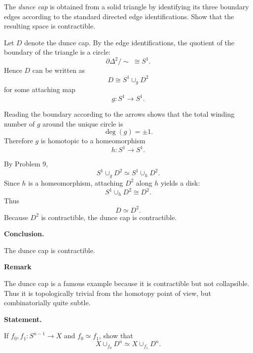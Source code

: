 \begin{problem}
The \emph{dunce cap} is obtained from a solid triangle by identifying its three boundary edges according to the standard directed edge identifications. Show that the resulting space is contractible.
\end{problem}

\begin{solution}
Let \(D\) denote the dunce cap. By the edge identifications, the quotient of the boundary of the triangle is a circle:
\[
\partial \Delta^2/\!\sim \;\cong S^1.
\]
Hence \(D\) can be written as
\[
D \cong S^1\cup_g D^2
\]
for some attaching map
\[
g:S^1\to S^1.
\]

Reading the boundary according to the arrows shows that the total winding number of \(g\) around the unique circle is
\[
\deg(g)=\pm1.
\]
Therefore \(g\) is homotopic to a homeomorphism
\[
h:S^1\to S^1.
\]

By Problem 9,
\[
S^1\cup_g D^2 \simeq S^1\cup_h D^2.
\]
Since \(h\) is a homeomorphism, attaching \(D^2\) along \(h\) yields a disk:
\[
S^1\cup_h D^2 \cong D^2.
\]
Thus
\[
D \simeq D^2.
\]
Because \(D^2\) is contractible, the dunce cap is contractible.


\medskip
\noindent\textbf{Conclusion.}\par
\smallskip

The dunce cap is contractible.


\medskip
\noindent\textbf{Remark}\par
\smallskip


The dunce cap is a famous example because it is contractible but not collapsible. Thus it is topologically trivial from the homotopy point of view, but combinatorially quite subtle.
\end{solution}

\begin{problem}

\medskip
\noindent\textbf{Statement.}\par
\smallskip

If \(f_0,f_1:S^{n-1}\to X\) and \(f_0\simeq f_1\), show that
\[
X\cup_{f_0} D^n \simeq X\cup_{f_1} D^n .
\]
\end{problem}

